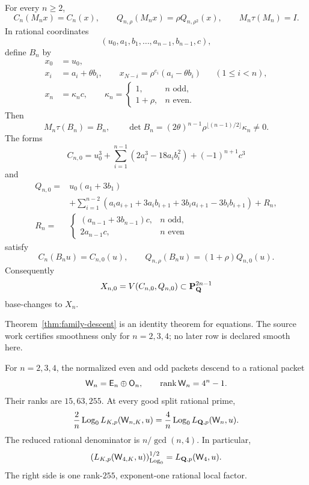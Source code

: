 \begin{theorem}
\label{thm:family-descent}
For every \(n\ge2\),
\[
C_n(M_nx)=C_n(x),\qquad
Q_{n,\rho}(M_nx)=\rho Q_{n,\rho^2}(x),\qquad
M_n\tau(M_n)=I.
\]
In rational coordinates
\[
(u_0,a_1,b_1,\ldots,a_{n-1},b_{n-1},c),
\]
define \(B_n\) by
\begin{align}
x_0&=u_0,\nonumber\\
x_i&=a_i+\theta b_i,\qquad
x_{N-i}=\rho^{e_i}(a_i-\theta b_i)
       &&(1\le i<n),\label{eq:B-pairs}\\
x_n&=\kappa_nc,\qquad
\kappa_n=\begin{cases}1,&n\text{ odd},\\1+\rho,&n\text{ even}.
\end{cases}\nonumber
\end{align}
Then
\begin{equation}
M_n\tau(B_n)=B_n,\qquad
\det B_n=(2\theta)^{n-1}\rho^{\lfloor(n-1)/2\rfloor}\kappa_n\ne0.
\label{eq:B-det}
\end{equation}
The forms
\begin{equation}
C_{n,0}=u_0^3+\sum_{i=1}^{n-1}(2a_i^3-18a_ib_i^2)
          +(-1)^{n+1}c^3
\label{eq:C0}
\end{equation}
and
\begin{align}
Q_{n,0}={}&u_0(a_1+3b_1)\nonumber\\
&+\sum_{i=1}^{n-2}
(a_ia_{i+1}+3a_ib_{i+1}+3b_ia_{i+1}-3b_ib_{i+1})
+R_n,\label{eq:Q0}\\
R_n={}&
\begin{cases}
(a_{n-1}+3b_{n-1})c,&n\text{ odd},\\
2a_{n-1}c,&n\text{ even}
\end{cases}\nonumber
\end{align}
satisfy
\[
C_n(B_nu)=C_{n,0}(u),\qquad
Q_{n,\rho}(B_nu)=(1+\rho)Q_{n,0}(u).
\]
Consequently
\[
X_{n,0}=V(C_{n,0},Q_{n,0})\subset\mathbf P_\mathbf Q^{2n-1}
\]
base-changes to \(X_n\).
\end{theorem}

Theorem~\ref{thm:family-descent} is an identity theorem for equations.
The source work certifies smoothness only for \(n=2,3,4\); no later row is
declared smooth here.

\begin{theorem}
\label{thm:packets-repair}
For \(n=2,3,4\), the normalized even and odd packets descend to a rational
packet
\[
\mathsf W_n=\mathsf E_n\oplus\mathsf O_n,\qquad
\operatorname{rank}\mathsf W_n=4^n-1.
\]
Their ranks are \(15,63,255\).  At every good split rational prime,
\[
\frac2n\operatorname{Log}_0 L_{K,p}(\mathsf W_{n,K},u)
=\frac4n\operatorname{Log}_0 L_{\mathbf Q,p}(\mathsf W_n,u).
\]
The reduced rational denominator is \(n/\gcd(n,4)\).  In particular,
\begin{equation}
\left(L_{K,p}(\mathsf W_{4,K},u)\right)^{1/2}_{\operatorname{Log}_0}
=L_{\mathbf Q,p}(\mathsf W_4,u).
\label{eq:split-repair}
\end{equation}
The right side is one rank-\(255\), exponent-one rational local factor.
\end{theorem}

